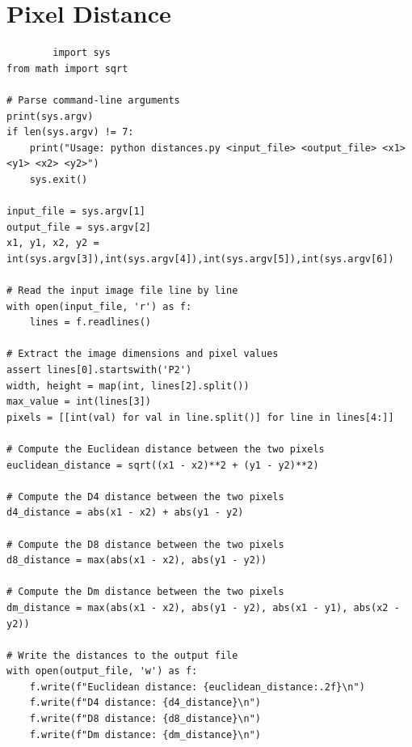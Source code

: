 \documentclass[a4paper,8pt]{article}
\begin{document}
        \section{Pixel Distance}
        \begin{verbatim}
        import sys
from math import sqrt

# Parse command-line arguments
print(sys.argv)
if len(sys.argv) != 7:
    print("Usage: python distances.py <input_file> <output_file> <x1> <y1> <x2> <y2>")
    sys.exit()

input_file = sys.argv[1]
output_file = sys.argv[2]
x1, y1, x2, y2 = int(sys.argv[3]),int(sys.argv[4]),int(sys.argv[5]),int(sys.argv[6])

# Read the input image file line by line
with open(input_file, 'r') as f:
    lines = f.readlines()

# Extract the image dimensions and pixel values
assert lines[0].startswith('P2')
width, height = map(int, lines[2].split())
max_value = int(lines[3])
pixels = [[int(val) for val in line.split()] for line in lines[4:]]

# Compute the Euclidean distance between the two pixels
euclidean_distance = sqrt((x1 - x2)**2 + (y1 - y2)**2)

# Compute the D4 distance between the two pixels
d4_distance = abs(x1 - x2) + abs(y1 - y2)

# Compute the D8 distance between the two pixels
d8_distance = max(abs(x1 - x2), abs(y1 - y2))

# Compute the Dm distance between the two pixels
dm_distance = max(abs(x1 - x2), abs(y1 - y2), abs(x1 - y1), abs(x2 - y2))

# Write the distances to the output file
with open(output_file, 'w') as f:
    f.write(f"Euclidean distance: {euclidean_distance:.2f}\n")
    f.write(f"D4 distance: {d4_distance}\n")
    f.write(f"D8 distance: {d8_distance}\n")
    f.write(f"Dm distance: {dm_distance}\n")


        \end{verbatim}
        
\end{document}

